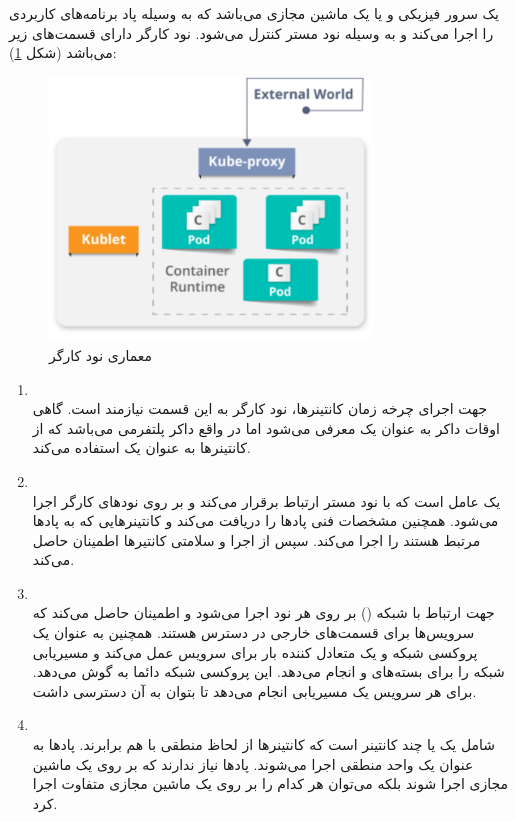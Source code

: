 یک سرور فیزیکی و یا یک ماشین مجازی می‌باشد که به وسیله پاد برنامه‌های کاربردی را اجرا می‌کند و به وسیله نود مستر کنترل می‌شود.  نود کارگر دارای قسمت‌های زیر می‌باشد (شکل \ref{تصویر 2-12}):

\begin{figure}[!h]
	\centering
	\includegraphics[height=7cm]{images/worker-node}
	\caption{ معماری نود کارگر}
	\label{تصویر 2-12}
\end{figure}

\begin{enumerate}
	\item
	\\
	جهت اجرای چرخه زمان کانتینرها، نود کارگر به این قسمت نیازمند است. گاهی اوقات داکر به عنوان یک 	معرفی می‌شود اما در واقع داکر پلتفرمی می‌باشد که از کانتینرها به عنوان یک  استفاده می‌کند. 
	
	\item
	\\
	یک عامل است که با نود مستر ارتباط برقرار می‌کند و بر روی نودهای کارگر اجرا می‌شود. همچنین مشخصات فنی پادها را دریافت می‌کند و کانتینرهایی که به پادها مرتبط هستند را اجرا می‌کند. سپس از اجرا و سلامتی کانتیرها اطمینان حاصل می‌کند.
	\item
	\\
	جهت ارتباط با شبکه () بر روی هر نود اجرا می‌شود و اطمینان حاصل می‌کند که سرویس‌ها برای قسمت‌های خارجی در دسترس هستند. همچنین به عنوان یک پروکسی شبکه و یک  متعادل کننده بار برای سرویس عمل می‌کند و مسیریابی شبکه را برای بسته‌های  و  انجام می‌دهد. این پروکسی شبکه دائما به  گوش می‌دهد. برای هر سرویس یک مسیریابی انجام می‌دهد تا بتوان به آن دسترسی داشت.
	\item
	\\
	شامل یک یا چند کانتینر است که کانتینرها از لحاظ منطقی با هم برابرند. پادها به عنوان یک واحد منطقی اجرا می‌شوند. پادها نیاز ندارند که بر روی یک ماشین مجازی اجرا شوند بلکه می‌توان هر کدام را بر روی یک ماشین مجازی متفاوت اجرا کرد. 
\end{enumerate}


